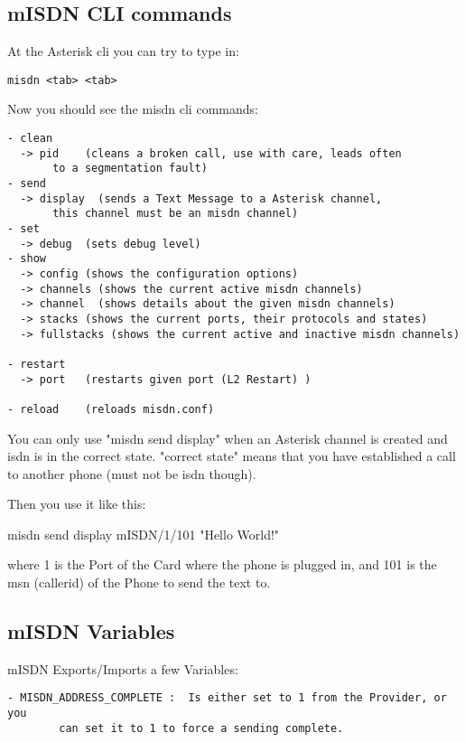 \subsection{mISDN CLI commands}

At the Asterisk cli you can try to type in:

\begin{verbatim}
misdn <tab> <tab>
\end{verbatim}

Now you should see the misdn cli commands:

\begin{astlisting}
\begin{verbatim}
- clean
  -> pid    (cleans a broken call, use with care, leads often
       to a segmentation fault)
- send
  -> display  (sends a Text Message to a Asterisk channel,
       this channel must be an misdn channel)
- set
  -> debug  (sets debug level)
- show
  -> config (shows the configuration options)
  -> channels (shows the current active misdn channels)
  -> channel  (shows details about the given misdn channels)
  -> stacks (shows the current ports, their protocols and states)
  -> fullstacks (shows the current active and inactive misdn channels)

- restart
  -> port   (restarts given port (L2 Restart) )

- reload    (reloads misdn.conf)
\end{verbatim}
\end{astlisting}

You can only use "misdn send display" when an Asterisk channel is created and
isdn is in the correct state. "correct state" means that you have established a
call to another phone (must not be isdn though).

Then you use it like this:

misdn send display mISDN/1/101 "Hello World!"

where 1 is the Port of the Card where the phone is plugged in, and 101 is the
msn (callerid) of the Phone to send the text to.

\subsection{mISDN Variables}

mISDN Exports/Imports a few Variables:

\begin{verbatim}
- MISDN_ADDRESS_COMPLETE :  Is either set to 1 from the Provider, or you
        can set it to 1 to force a sending complete.
\end{verbatim}


